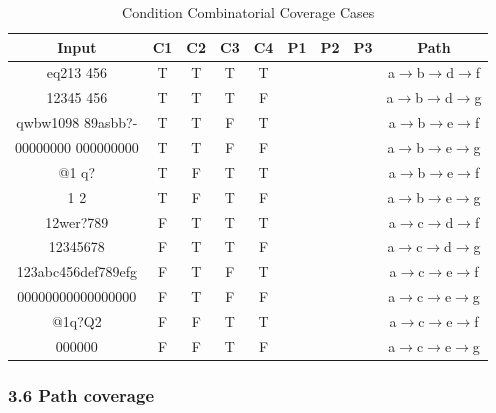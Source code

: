 \documentclass[11pt, oneside]{article}  %
\begin{document}
\begin{table}[H]
    \centering
    \begin{tabular}{|c|c|c|c|c|c|c|c|c|}
    \hline
        Input              & C1 & C2 & C3 & C4 & P1 & P2 & P3 & Path                                              \\ \hline
        eq213 456          & T  & T  & T  & T  &    &    &    & a$\rightarrow$b$\rightarrow$d$\rightarrow$f \\ \hline
        12345 456          & T  & T  & T  & F  &    &    &    & a$\rightarrow$b$\rightarrow$d$\rightarrow$g \\ \hline
        qwbw1098 89asbb?-  & T  & T  & F  & T  &    &    &    & a$\rightarrow$b$\rightarrow$e$\rightarrow$f \\ \hline
        00000000 000000000 & T  & T  & F  & F  &    &    &    & a$\rightarrow$b$\rightarrow$e$\rightarrow$g \\ \hline
        @1 q?              & T  & F  & T  & T  &    &    &    & a$\rightarrow$b$\rightarrow$e$\rightarrow$f \\ \hline
        1 2                & T  & F  & T  & F  &    &    &    & a$\rightarrow$b$\rightarrow$e$\rightarrow$g \\ \hline
        12wer?789          & F  & T  & T  & T  &    &    &    & a$\rightarrow$c$\rightarrow$d$\rightarrow$f \\ \hline
        12345678           & F  & T  & T  & F  &    &    &    & a$\rightarrow$c$\rightarrow$d$\rightarrow$g \\ \hline
        123abc456def789efg & F  & T  & F  & T  &    &    &    & a$\rightarrow$c$\rightarrow$e$\rightarrow$f \\ \hline
        00000000000000000  & F  & T  & F  & F  &    &    &    & a$\rightarrow$c$\rightarrow$e$\rightarrow$g \\ \hline
        @1q?Q2             & F  & F  & T  & T  &    &    &    & a$\rightarrow$c$\rightarrow$e$\rightarrow$f \\ \hline
        000000             & F  & F  & T  & F  &    &    &    & a$\rightarrow$c$\rightarrow$e$\rightarrow$g \\ \hline
    \end{tabular}
    \caption{Condition Combinatorial Coverage Cases}
\end{table}

\subsubsection*{3.6 Path coverage}
\end{document}
